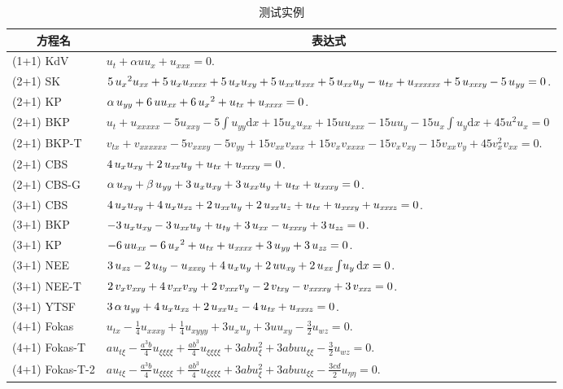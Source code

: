 \documentclass[12pt,a4paper,UTF8]{article}
\numberwithin{equation}{section}
\newcommand{\dd}[1]{\mathrm{d}#1}
\begin{document}
\begin{table}[htbp]
\centering
\caption{测试实例}\label{eqs}
\begin{tabular}{lp{}}
\hline
\multicolumn{1}{c}{方程名} & \multicolumn{1}{c}{表达式} \\
\hline
(1+1) KdV & $ u_t+\alpha uu_x+u_{xxx}=0.$\\
(2+1) SK & $5\,{u_{{x}}}^{2}u_{{{\it xx}}}+5\,u_{{x}}u_{{{\it xxxx}}}+5\,u_{{x}}u_{{{\it xy}}}+5\,u_{{{\it xx}}}u_{{{\it xxx}}}+5\,u_{{{\it xx}}}u_{{y}}-u_{{{\it tx}}}+u_{{{\it xxxxxx}}}+5\,u_{{{\it xxxy}}}-5\,u_{{{\it yy}}}=0$.\\
(2+1) KP & $\alpha\,u_{{{\it yy}}}+6\,uu_{{{\it xx}}}+6\,{u_{{x}}}^{2}+u_{{{\it tx}}}+u_{{{\it xxxx}}}=0$.\\
(2+1) BKP & $u_t+u_{xxxxx}-5u_{xxy}-5\int{u_{yy}\dd{x}}+15u_xu_{xx}+15uu_{xxx}-15uu_y-15u_x\int{u_y\dd{x}}+45u^2u_x=0$ \\
(2+1) BKP-T & $v_{tx}+v_{xxxxxx}-5v_{xxxy}-5v_{yy}+15v_{xx}v_{xxx}+15v_xv_{xxxx}-15v_xv_{xy}-15v_{xx}v_y+45v_x^2v_{xx}=0$. \\
(2+1) CBS & $4\,u_{{x}}u_{{{\it xy}}}+2\,u_{{{\it xx}}}u_{{y}}+u_{{{\it tx}}}+u_{{{\it xxxy}}}=0$.\\
(2+1) CBS-G & $\alpha\,u_{{{\it xy}}}+\beta\,u_{{{\it yy}}}+3\,u_{{x}}u_{{{\it xy}}}+3\,u_{{{\it xx}}}u_{{y}}+u_{{{\it tx}}}+u_{{{\it xxxy}}}=0$.\\
(3+1) CBS & $4\,u_{{x}}u_{{{\it xy}}}+4\,u_{{x}}u_{{{\it xz}}}+2\,u_{{{\it xx}}}u_{{y}}+2\,u_{{{\it xx}}}u_{{z}}+u_{{{\it tx}}}+u_{{{\it xxxy}}}+u_{{{\it xxxz}}}=0$.\\
(3+1) BKP & $-3\,u_{{x}}u_{{{\it xy}}}-3\,u_{{{\it xx}}}u_{{y}}+u_{{{\it ty}}}+3\,u_{{{\it xx}}}-u_{{{\it xxxy}}}+3\,u_{{{\it zz}}}=0$.\\
(3+1) KP & $-6\,uu_{{{\it xx}}}-6\,{u_{{x}}}^{2}+u_{{{\it tx}}}+u_{{{\it xxxx}}}+3\,u_{{{\it yy}}}+3\,u_{{{\it zz}}}=0$.\\
(3+1) NEE & $3\,u_{{{\it xz}}}-2\,u_{{{\it ty}}}-u_{{{\it xxxy}}}+4\,u_{{x}}u_{{y}}+2\,uu_{{{\it xy}}}+2\,u_{{{\it xx}}}\int \!u_{{y}}\,{\rm d}x=0$.\\
(3+1) NEE-T & $2\,v_{{x}}v_{{{\it xxy}}}+4\,v_{{{\it xx}}}v_{{{\it xy}}}+2\,v_{{{\it xxx}}}v_{{y}}-2\,v_{{{\it txy}}}-v_{{{\it xxxxy}}}+3\,v_{{{\it xxz}}}=0$.\\
(3+1) YTSF & $3\,\alpha\,u_{{{\it yy}}}+4\,u_{{x}}u_{{{\it xz}}}+2\,u_{{{\it xx}}}u_{{z}}-4\,u_{{{\it tx}}}+u_{{{\it xxxz}}}=0$.\\
(4+1) Fokas & $u_{tx}-\frac{1}{4}u_{xxxy}+\frac{1}{4}u_{xyyy}+3u_xu_y+3uu_{xy}-\frac{3}{2}u_{wz}=0.$ \\
(4+1) Fokas-T & $au_{t\xi}-\frac{a^3b}{4}u_{\xi\xi\xi\xi}+\frac{ab^3}{4}u_{\xi\xi\xi\xi}+3abu_{\xi}^2+3abuu_{\xi\xi}-\frac{3}{2}u_{wz}=0.$  \\ 
(4+1) Fokas-T-2 & $au_{t\xi}-\frac{a^3b}{4}u_{\xi\xi\xi\xi}+\frac{ab^3}{4}u_{\xi\xi\xi\xi}+3abu_{\xi}^2+3abuu_{\xi\xi}-\frac{3cd}{2}u_{\eta\eta}=0.$\\
\hline
\end{tabular}
\end{table}
\end{document}
